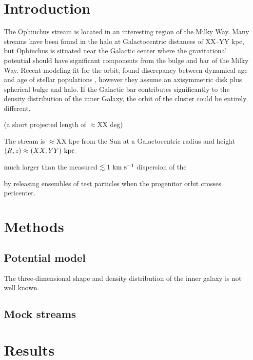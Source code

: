 \documentclass[letterpaper,12pt,preprint]{aastex}
\begin{document}

\section{Introduction}\label{sec:introduction}

The Ophiuchus stream \citep{bernard14} is located in an interesting region of the Milky Way. Many streams have been found in the halo at Galactocentric distances of XX--YY kpc, but Ophiuchus is situated near the Galactic center where the gravitational potential should have significant components from the bulge and bar of the Milky Way. Recent modeling fit for the orbit, found discrepancy between dynamical age and age of stellar populations \citep{sesar15}, however they assume an axisymmetric disk plus spherical bulge and halo. If the Galactic bar contributes significantly to the density distribution of the inner Galaxy, the orbit of the cluster could be entirely different.

(a short projected length of $\approx$XX deg)

The stream is $\approx$XX kpc from the Sun at a Galactocentric radius and height $(R,z) \approx (XX, YY)~{\rm kpc}$.

much larger than the measured $\lesssim 1~{\rm km}~{\rm s}^{-1}$ dispersion of the 

by releasing ensembles of test particles when the progenitor orbit crosses pericenter.

\section{Methods}\label{sec:method}

\subsection{Potential model}\label{sec:potential}

The three-dimensional shape and density distribution of the inner galaxy is not well known. 

\subsection{Mock streams}\label{sec:mocks}

\section{Results}
\end{document}
